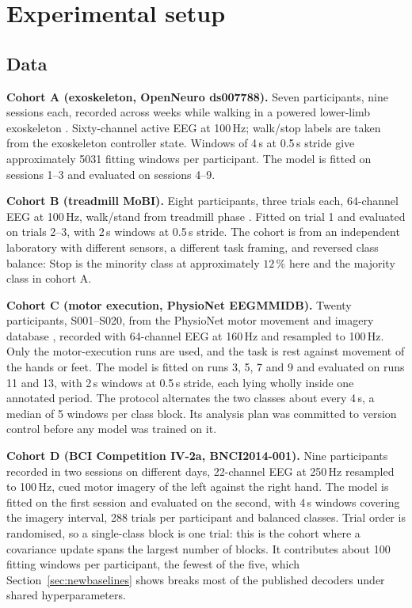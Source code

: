 \documentclass[a4paper,fleqn]{cas-dc}
\begin{document}
\section{Experimental setup}

\subsection{Data}
\label{sec:data}

\textbf{Cohort A (exoskeleton, OpenNeuro ds007788).} Seven participants, nine
sessions each, recorded across weeks while walking in a powered lower-limb
exoskeleton \citep{contrerasvidal}. Sixty-channel active EEG at 100\,Hz;
walk/stop labels are taken from the exoskeleton controller state. Windows of
4\,s at 0.5\,s stride give approximately 5031 fitting windows per participant.
The model is fitted on sessions 1--3 and evaluated on sessions 4--9.

\textbf{Cohort B (treadmill MoBI).} Eight participants, three trials each,
64-channel EEG at 100\,Hz, walk/stand from treadmill phase \citep{luu}. Fitted
on trial 1 and evaluated on trials 2--3, with 2\,s windows at 0.5\,s stride. The cohort is from
an independent laboratory with different sensors, a different task framing, and
reversed class balance: Stop is the minority class at approximately $12\,\%$
here and the majority class in cohort A.

\textbf{Cohort C (motor execution, PhysioNet EEGMMIDB).} Twenty participants,
S001--S020, from the PhysioNet motor movement and imagery database
\citep{schalk2004,goldberger2000}, recorded with 64-channel EEG at 160\,Hz and
resampled to 100\,Hz. Only the motor-execution runs are used, and the task is
rest against movement of the hands or feet. The model is fitted on runs 3, 5,
7 and 9 and evaluated on runs 11 and 13, with 2\,s windows at 0.5\,s stride,
each lying wholly inside one annotated period. The protocol alternates the two
classes about every 4\,s, a median of 5 windows per class block. Its analysis plan was committed to version control before any model was trained on it.

\textbf{Cohort D (BCI Competition IV-2a, BNCI2014-001).} \citep{tangermann} Nine participants recorded in two sessions on different days, 22-channel EEG at 250\,Hz resampled to 100\,Hz, cued motor imagery of the left against the right hand. The model is fitted on the first session and evaluated on the second, with 4\,s windows covering the imagery interval, 288 trials per participant and balanced classes. Trial order is randomised, so a single-class block is one trial: this is the cohort where a covariance update spans the largest number of blocks. It contributes about 100 fitting windows per participant, the fewest of the five, which Section~\ref{sec:newbaselines} shows breaks most of the published decoders under shared hyperparameters.
\end{document}
